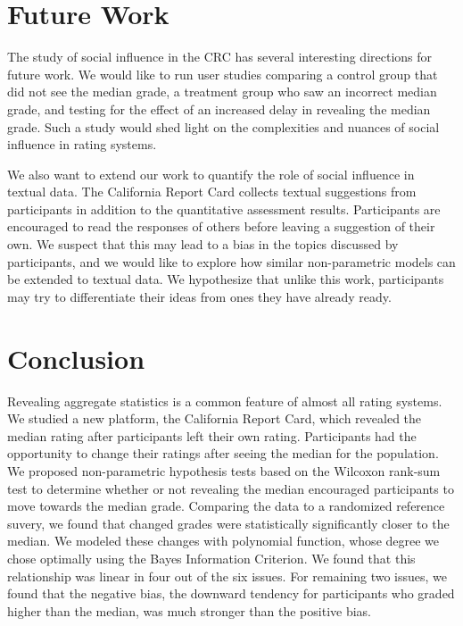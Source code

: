 \section{Future Work}
The study of social influence in the CRC has several interesting directions for future work.
We would like to run user studies comparing a control group that did not see the median grade, 
a treatment group who saw an incorrect median grade, and testing for the effect of an increased delay in revealing the median grade.
Such a study would shed light on the complexities and nuances of social influence in rating systems.
 
We also want to extend our work to quantify the role of social influence in textual data. 
The California Report Card collects textual suggestions from participants in addition to the quantitative assessment results. 
Participants are encouraged to read the responses of others before leaving a suggestion of their own.
We suspect that this may lead to a bias in the topics discussed by participants, and we would like to explore how similar non-parametric models can be extended to textual data.
We hypothesize that unlike this work, participants may try to differentiate their ideas from ones they have already ready.
\section{Conclusion}
Revealing aggregate statistics is a common feature of almost all rating systems.
We studied a new platform, the California Report Card, which revealed the median rating after participants left their own rating.
Participants had the opportunity to change their ratings after seeing the median for the population.
We proposed non-parametric hypothesis tests based on the Wilcoxon rank-sum test to determine whether or not revealing the median encouraged participants to move towards the median grade.
Comparing the data to a randomized reference suvery, we found that changed grades were statistically significantly closer to the median.
We modeled these changes with polynomial function, whose degree we chose optimally using the Bayes Information Criterion. 
We found that this relationship was linear in four out of the six issues.
For remaining two issues, we found that the negative bias, the downward tendency for participants who graded higher than the median, was much stronger than the positive bias.


